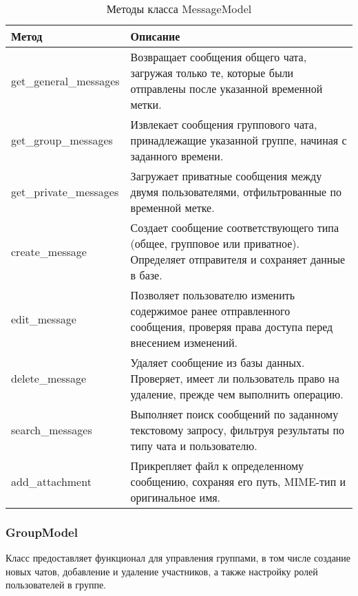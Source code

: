 \begin{xltabular}{\textwidth}{|l|X|}
	\caption{Методы класса MessageModel}\\ \hline
	\centrow Метод & \centrow Описание \\ \hline
	get\_general\_messages & Возвращает сообщения общего чата, загружая только те, которые были отправлены после указанной временной метки. \\ \hline
	get\_group\_messages & Извлекает сообщения группового чата, принадлежащие указанной группе, начиная с заданного времени. \\ \hline
	get\_private\_messages & Загружает приватные сообщения между двумя пользователями, отфильтрованные по временной метке. \\ \hline
	create\_message & Создает сообщение соответствующего типа (общее, групповое или приватное). Определяет отправителя и сохраняет данные в базе. \\ \hline
	edit\_message & Позволяет пользователю изменить содержимое ранее отправленного сообщения, проверяя права доступа перед внесением изменений. \\ \hline
	delete\_message & Удаляет сообщение из базы данных. Проверяет, имеет ли пользователь право на удаление, прежде чем выполнить операцию. \\ \hline
	search\_messages & Выполняет поиск сообщений по заданному текстовому запросу, фильтруя результаты по типу чата и пользователю. \\ \hline
	add\_attachment & Прикрепляет файл к определенному сообщению, сохраняя его путь, MIME-тип и оригинальное имя. \\ \hline
\end{xltabular}

\subsubsection{GroupModel}

Класс предоставляет функционал для управления группами, в том числе создание новых чатов, добавление и удаление участников, а также настройку ролей пользователей в группе.

